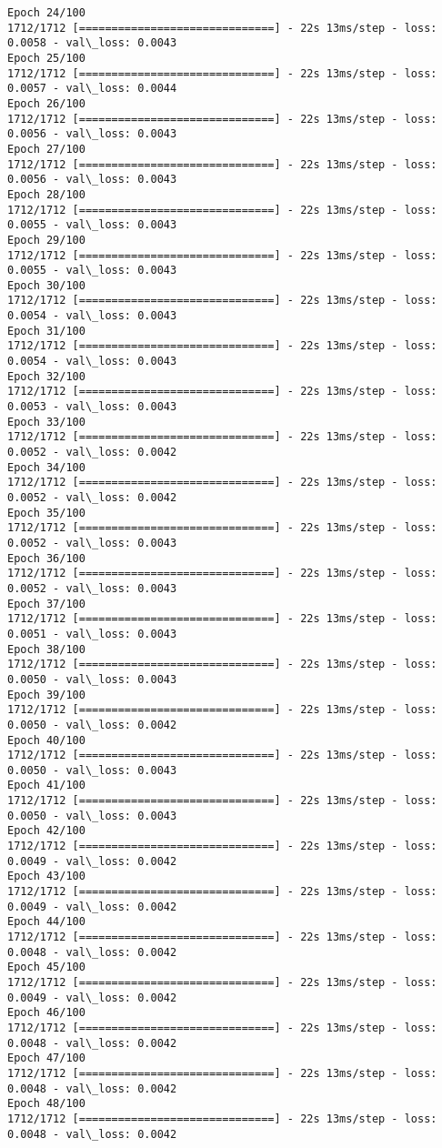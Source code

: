 \documentclass[11pt]{article}
\begin{document}
\begin{Verbatim}[commandchars=\\\{\}]
Epoch 24/100
1712/1712 [==============================] - 22s 13ms/step - loss: 0.0058 - val\_loss: 0.0043
Epoch 25/100
1712/1712 [==============================] - 22s 13ms/step - loss: 0.0057 - val\_loss: 0.0044
Epoch 26/100
1712/1712 [==============================] - 22s 13ms/step - loss: 0.0056 - val\_loss: 0.0043
Epoch 27/100
1712/1712 [==============================] - 22s 13ms/step - loss: 0.0056 - val\_loss: 0.0043
Epoch 28/100
1712/1712 [==============================] - 22s 13ms/step - loss: 0.0055 - val\_loss: 0.0043
Epoch 29/100
1712/1712 [==============================] - 22s 13ms/step - loss: 0.0055 - val\_loss: 0.0043
Epoch 30/100
1712/1712 [==============================] - 22s 13ms/step - loss: 0.0054 - val\_loss: 0.0043
Epoch 31/100
1712/1712 [==============================] - 22s 13ms/step - loss: 0.0054 - val\_loss: 0.0043
Epoch 32/100
1712/1712 [==============================] - 22s 13ms/step - loss: 0.0053 - val\_loss: 0.0043
Epoch 33/100
1712/1712 [==============================] - 22s 13ms/step - loss: 0.0052 - val\_loss: 0.0042
Epoch 34/100
1712/1712 [==============================] - 22s 13ms/step - loss: 0.0052 - val\_loss: 0.0042
Epoch 35/100
1712/1712 [==============================] - 22s 13ms/step - loss: 0.0052 - val\_loss: 0.0043
Epoch 36/100
1712/1712 [==============================] - 22s 13ms/step - loss: 0.0052 - val\_loss: 0.0043
Epoch 37/100
1712/1712 [==============================] - 22s 13ms/step - loss: 0.0051 - val\_loss: 0.0043
Epoch 38/100
1712/1712 [==============================] - 22s 13ms/step - loss: 0.0050 - val\_loss: 0.0043
Epoch 39/100
1712/1712 [==============================] - 22s 13ms/step - loss: 0.0050 - val\_loss: 0.0042
Epoch 40/100
1712/1712 [==============================] - 22s 13ms/step - loss: 0.0050 - val\_loss: 0.0043
Epoch 41/100
1712/1712 [==============================] - 22s 13ms/step - loss: 0.0050 - val\_loss: 0.0043
Epoch 42/100
1712/1712 [==============================] - 22s 13ms/step - loss: 0.0049 - val\_loss: 0.0042
Epoch 43/100
1712/1712 [==============================] - 22s 13ms/step - loss: 0.0049 - val\_loss: 0.0042
Epoch 44/100
1712/1712 [==============================] - 22s 13ms/step - loss: 0.0048 - val\_loss: 0.0042
Epoch 45/100
1712/1712 [==============================] - 22s 13ms/step - loss: 0.0049 - val\_loss: 0.0042
Epoch 46/100
1712/1712 [==============================] - 22s 13ms/step - loss: 0.0048 - val\_loss: 0.0042
Epoch 47/100
1712/1712 [==============================] - 22s 13ms/step - loss: 0.0048 - val\_loss: 0.0042
Epoch 48/100
1712/1712 [==============================] - 22s 13ms/step - loss: 0.0048 - val\_loss: 0.0042

\end{Verbatim}
\end{document}
